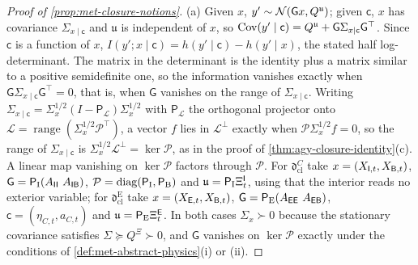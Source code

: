 \begin{proof}[Proof of \cref{prop:met-closure-notions}]
(a) Given $x$, $y'\sim\mathcal{N}(\mathsf Gx,Q^{\mathfrak u})$; given $\mathsf c$, $x$ has covariance $\Sigma_{x\mid\mathsf c}$ and $\mathfrak u$ is independent of $x$, so $\operatorname{Cov}(y'\mid\mathsf c)=Q^{\mathfrak u}+\mathsf G\Sigma_{x\mid\mathsf c}\mathsf G^\top$. Since $\mathsf c$ is a function of $x$, $I(y';x\mid\mathsf c)=h(y'\mid\mathsf c)-h(y'\mid x)$, the stated half log-determinant. The matrix in the determinant is the identity plus a matrix similar to a positive semidefinite one, so the information vanishes exactly when $\mathsf G\Sigma_{x\mid\mathsf c}\mathsf G^\top=0$, that is, when $\mathsf G$ vanishes on the range of $\Sigma_{x\mid\mathsf c}$. Writing $\Sigma_{x\mid\mathsf c}=\Sigma_x^{1/2}(I-\mathsf P_{\mathcal L})\Sigma_x^{1/2}$ with $\mathsf P_{\mathcal L}$ the orthogonal projector onto $\mathcal L=\operatorname{range}(\Sigma_x^{1/2}\mathcal P^\top)$, a vector $f$ lies in $\mathcal L^\perp$ exactly when $\mathcal P\Sigma_x^{1/2}f=0$, so the range of $\Sigma_{x\mid\mathsf c}$ is $\Sigma_x^{1/2}\mathcal L^\perp=\ker\mathcal P$, as in the proof of \cref{thm:agy-closure-identity}(c). A linear map vanishing on $\ker\mathcal P$ factors through $\mathcal P$. For $\mathfrak d^C_{\mathrm{cl}}$ take $x=(X_{\mathsf{I},t},X_{\mathsf{B},t})$, $\mathsf G=\mathsf P_{\mathrm I}(A_{\sI\sI}\ A_{\sI\sB})$, $\mathcal P=\operatorname{diag}(\mathsf P_{\mathrm I},\mathsf P_{\mathrm B})$ and $\mathfrak u=\mathsf P_{\mathrm I}\Xi^{\mathsf{I}}_t$, using that the interior reads no exterior variable; for $\mathfrak d^{\mathrm E}_{\mathrm{cl}}$ take $x=(X_{\mathsf{E},t},X_{\mathsf{B},t})$, $\mathsf G=\mathsf P_{\mathrm E}(A_{\sE\sE}\ A_{\sE\sB})$, $\mathsf c=(\eta_{C,t},a_{C,t})$ and $\mathfrak u=\mathsf P_{\mathrm E}\Xi^{\mathsf{E}}_t$. In both cases $\Sigma_x\succ0$ because the stationary covariance satisfies $\Sigma\succeq Q^{\Xi}\succ0$, and $\mathsf G$ vanishes on $\ker\mathcal P$ exactly under the conditions of \cref{def:met-abstract-physics}(i) or (ii).


\end{proof}
